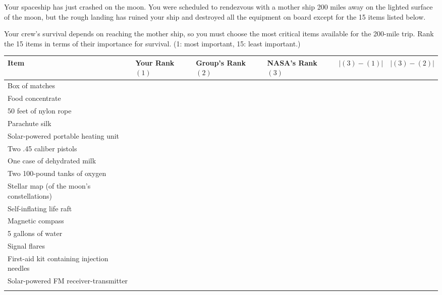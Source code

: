 Your spaceship has just crashed on the moon. You were scheduled to rendezvous
with a mother ship 200 miles away on the lighted surface of the moon, but the
rough landing has ruined your ship and destroyed all the equipment on board
except for the 15 items listed below.

Your crew's survival depends on reaching the mother ship, so you must choose
the most critical items available for the 200-mile trip. Rank the 15 items in
terms of their importance for survival. (1: most important, 15: least
important.)

\ifprintanswers\else
\begin{center}
    \begin{tabular}{|>{\raggedright}p{6cm}|m{1.5cm}|m{1.5cm}|m{1.5cm}|m{1.7cm}|m{1.7cm}|}
        \hline
        Item & Your Rank $(1)$ & Group's Rank $(2)$ & NASA's Rank $(3)$ &
            $\left\lvert(3)-(1)\right\rvert$ &
            $\left\lvert(3)-(2)\right\rvert$ \\ \hline
        Box of matches & & & & & \\[2ex] \hline
        Food concentrate & & & & & \\[2ex] \hline
        50 feet of nylon rope & & & & & \\[2ex] \hline
        Parachute silk & & & & & \\[2ex] \hline
        Solar-powered portable heating unit & & & & & \\[2ex] \hline
        Two .45 caliber pistols & & & & & \\[2ex] \hline
        One case of dehydrated milk & & & & & \\[2ex] \hline
        Two 100-pound tanks of oxygen & & & & & \\[2ex] \hline
        Stellar map (of the moon's constellations) & & & & & \\[2ex] \hline
        Self-inflating life raft & & & & & \\[2ex] \hline
        Magnetic compass & & & & & \\[2ex] \hline
        5 gallons of water & & & & & \\[2ex] \hline
        Signal flares & & & & & \\[2ex] \hline
        First-aid kit containing injection needles & & & & & \\[2ex] \hline
        Solar-powered FM receiver-transmitter & & & & & \\[2ex] \hline
        \multicolumn{4}{|p{10.5cm}|}{{\bf Total}} & & \\[2ex] \hline
    \end{tabular}
\end{center}
\fi

